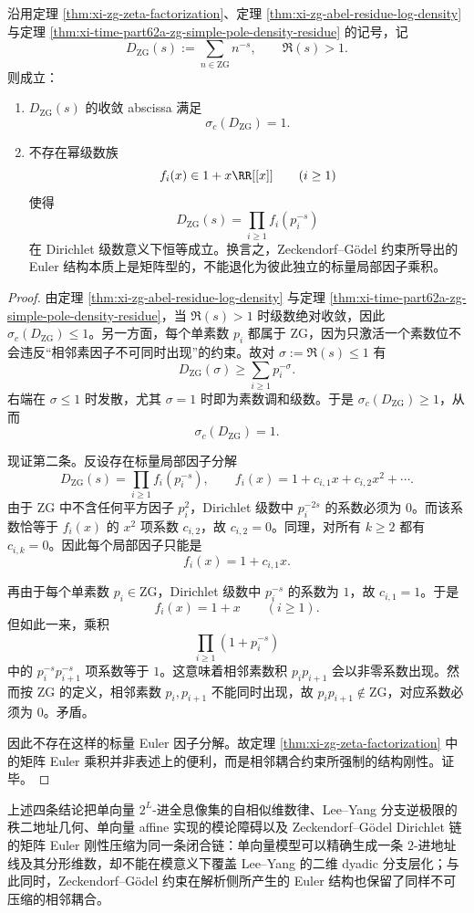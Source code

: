 \begin{conclusion}\label{con:xi-time-part62b-zg-critical-exponent-matrix-euler-rigidity}
沿用定理 \ref{thm:xi-zg-zeta-factorization}、定理 \ref{thm:xi-zg-abel-residue-log-density} 与定理 \ref{thm:xi-time-part62a-zg-simple-pole-density-residue} 的记号，记
\[
D_{\mathrm{ZG}}(s):=\sum_{n\in \mathrm{ZG}}n^{-s},
\qquad
\Re(s)>1.
\]
则成立：
\begin{enumerate}
  \item \(D_{\mathrm{ZG}}(s)\) 的收敛 abscissa 满足
  \[
  \sigma_c(D_{\mathrm{ZG}})=1.
  \]
  \item 不存在幂级数族
  \[
  f_i(x)\in 1+x\RR[[x]]
  \qquad (i\ge 1)
  \]
  使得
  \[
  D_{\mathrm{ZG}}(s)=\prod_{i\ge 1}f_i(p_i^{-s})
  \]
  在 Dirichlet 级数意义下恒等成立。换言之，Zeckendorf--Gödel 约束所导出的 Euler 结构本质上是矩阵型的，不能退化为彼此独立的标量局部因子乘积。
\end{enumerate}
\end{conclusion}
\begin{proof}
由定理 \ref{thm:xi-zg-abel-residue-log-density} 与定理 \ref{thm:xi-time-part62a-zg-simple-pole-density-residue}，当 \(\Re(s)>1\) 时级数绝对收敛，因此 \(\sigma_c(D_{\mathrm{ZG}})\le 1\)。另一方面，每个单素数 \(p_i\) 都属于 \(\mathrm{ZG}\)，因为只激活一个素数位不会违反“相邻素因子不可同时出现”的约束。故对 \(\sigma:=\Re(s)\le 1\) 有
\[
D_{\mathrm{ZG}}(\sigma)\ge \sum_{i\ge 1}p_i^{-\sigma}.
\]
右端在 \(\sigma\le 1\) 时发散，尤其 \(\sigma=1\) 时即为素数调和级数。于是 \(\sigma_c(D_{\mathrm{ZG}})\ge 1\)，从而
\[
\sigma_c(D_{\mathrm{ZG}})=1.
\]

现证第二条。反设存在标量局部因子分解
\[
D_{\mathrm{ZG}}(s)=\prod_{i\ge 1}f_i(p_i^{-s}),
\qquad
f_i(x)=1+c_{i,1}x+c_{i,2}x^2+\cdots .
\]
由于 \(\mathrm{ZG}\) 中不含任何平方因子 \(p_i^2\)，Dirichlet 级数中 \(p_i^{-2s}\) 的系数必须为 \(0\)。而该系数恰等于 \(f_i(x)\) 的 \(x^2\) 项系数 \(c_{i,2}\)，故 \(c_{i,2}=0\)。同理，对所有 \(k\ge 2\) 都有 \(c_{i,k}=0\)。因此每个局部因子只能是
\[
f_i(x)=1+c_{i,1}x.
\]

再由于每个单素数 \(p_i\in \mathrm{ZG}\)，Dirichlet 级数中 \(p_i^{-s}\) 的系数为 \(1\)，故 \(c_{i,1}=1\)。于是
\[
f_i(x)=1+x
\qquad (i\ge 1).
\]
但如此一来，乘积
\[
\prod_{i\ge 1}(1+p_i^{-s})
\]
中的 \(p_i^{-s}p_{i+1}^{-s}\) 项系数等于 \(1\)。这意味着相邻素数积 \(p_ip_{i+1}\) 会以非零系数出现。然而按 \(\mathrm{ZG}\) 的定义，相邻素数 \(p_i,p_{i+1}\) 不能同时出现，故 \(p_ip_{i+1}\notin \mathrm{ZG}\)，对应系数必须为 \(0\)。矛盾。

因此不存在这样的标量 Euler 因子分解。故定理 \ref{thm:xi-zg-zeta-factorization} 中的矩阵 Euler 乘积并非表述上的便利，而是相邻耦合约束所强制的结构刚性。证毕。
\end{proof}

\noindent
上述四条结论把单向量 \(2^L\)-进全息像集的自相似维数律、Lee--Yang 分支逆极限的秩二地址几何、单向量 affine 实现的模论障碍以及 Zeckendorf--Gödel Dirichlet 链的矩阵 Euler 刚性压缩为同一条闭合链：单向量模型可以精确生成一条 \(2\)-进地址线及其分形维数，却不能在模意义下覆盖 Lee--Yang 的二维 dyadic 分支层化；与此同时，Zeckendorf--Gödel 约束在解析侧所产生的 Euler 结构也保留了同样不可压缩的相邻耦合。

\endinput
